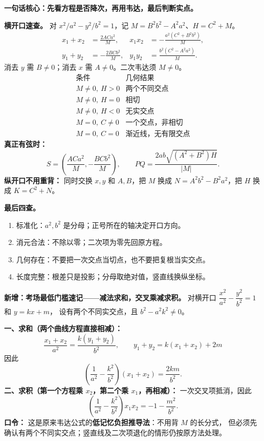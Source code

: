 \begin{summarybox}
\textbf{一句话核心：先看方程是否降次，再用韦达，最后判断实点。}

\textbf{横开口速查。} 对 $x^2/a^2-y^2/b^2=1$，记
$M=B^2b^2-A^2a^2$、$H=C^2+M$。
\[
 \begin{aligned}
 x_1+x_2&=\frac{2ACa^2}{M},&
 x_1x_2&=-\frac{a^2(C^2+B^2b^2)}{M},\\
 y_1+y_2&=-\frac{2BCb^2}{M},&
 y_1y_2&=\frac{b^2(C^2-A^2a^2)}{M}.
 \end{aligned}
\]
消去 $y$ 需 $B\ne0$；消去 $x$ 需 $A\ne0$。二次韦达须 $M\ne0$。
\[
 \begin{array}{c|c}
 \text{条件}&\text{几何结果}\\\hline
 M\ne0,\ H>0&\text{两个不同交点}\\
 M\ne0,\ H=0&\text{相切}\\
 M\ne0,\ H<0&\text{无实交点}\\
 M=0,\ C\ne0&\text{一个交点，非相切}\\
 M=0,\ C=0&\text{渐近线，无有限交点}
 \end{array}
\]
\textbf{真正有弦时：}
\[
 S=\left(\frac{ACa^2}{M},-\frac{BCb^2}{M}\right),\qquad
 PQ=\frac{2ab\sqrt{(A^2+B^2)H}}{|M|}.
\]
\textbf{纵开口不用重背：} 同时交换 $x,y$ 和 $A,B$，把 $M$ 换成 $N=A^2b^2-B^2a^2$，把 $H$ 换成 $K=C^2+N$。

\textbf{最后四查。}
\begin{enumerate}[leftmargin=*,itemsep=.4em]
 \item 标准化：$a^2,b^2$ 是分母；正号所在的轴决定开口方向。
 \item 消元合法：不除以零；二次项为零先回原方程。
 \item 几何存在：不要把一次交点当切点，也不要把复根当实交点。
 \item 长度完整：根差只是投影；分母取绝对值，竖直线换纵坐标。
\end{enumerate}
\end{summarybox}
\begin{summarybox}
\textbf{新增：考场最低门槛速记——减法求和，交叉乘减求积。}
对横开口 $\dfrac{x^2}{a^2}-\dfrac{y^2}{b^2}=1$ 和 $y=kx+m$，
设有两个不同实交点，且 $b^2-a^2k^2\ne0$。

\textbf{一、求和（两个曲线方程直接相减）：}
\[
 \frac{x_1+x_2}{a^2}=\frac{k(y_1+y_2)}{b^2},\qquad
 y_1+y_2=k(x_1+x_2)+2m
\]
因此
\[
 \boxed{\left(\frac1{a^2}-\frac{k^2}{b^2}\right)(x_1+x_2)
 =\frac{2km}{b^2}}.
\]
\textbf{二、求积（第一个方程乘 $x_2$，第二个乘 $x_1$，再相减）：}
一次交叉项抵消，因此
\[
 \boxed{\left(\frac1{a^2}-\frac{k^2}{b^2}\right)x_1x_2
 =-1-\frac{m^2}{b^2}}.
\]
\textbf{口令：}
这是原来韦达公式的\textbf{低记忆负担推导法}：不用背 $M$ 的长分式，
但必须先确认有两个不同实交点；竖直线及二次项退化的情形仍按原方法处理。
\end{summarybox}

